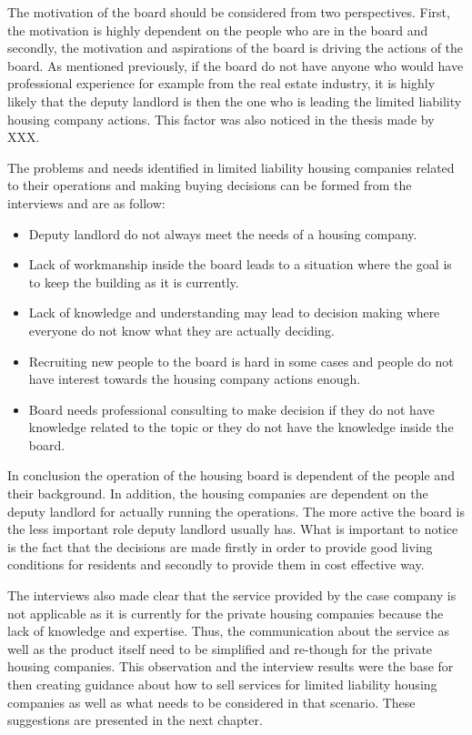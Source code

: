 The motivation of the board should be considered from two perspectives. First, the motivation is highly dependent on the people who are in the board and secondly, the motivation and aspirations of the board is driving the actions of the board. As mentioned previously, if the board do not have anyone who would have professional experience for example from the real estate industry, it is highly likely that the deputy landlord is then the one who is leading the limited liability housing company actions. This factor was also noticed in the thesis made by XXX.

The problems and needs identified in limited liability housing companies related to their operations and making buying decisions can be formed from the interviews and are as follow:
\begin{itemize}
	\setlength{\itemsep}{1pt}
	\item Deputy landlord do not always meet the needs of a housing company.
	\item Lack of workmanship inside the board leads to a situation where the goal is to keep the building as it is currently.
	\item Lack of knowledge and understanding may lead to decision making where everyone do not know what they are actually deciding.
	\item Recruiting new people to the board is hard in some cases and people do not have interest towards the housing company actions enough.
	\item Board needs professional consulting to make decision if they do not have knowledge related to the topic or they do not have the knowledge inside the board.
\end{itemize}

In conclusion the operation of the housing board is dependent of the people and their background. In addition, the housing companies are dependent on the deputy landlord for actually running the operations. The more active the board is the less important role deputy landlord usually has. What is important to notice is the fact that the decisions are made firstly in order to provide good living conditions for residents and secondly to provide them in cost effective way.

The interviews also made clear that the service provided by the case company is not applicable as it is currently for the private housing companies because the lack of knowledge and expertise. Thus, the communication about the service  as well as the product itself need to be simplified and re-though for the private housing companies. This observation and the interview results were the base for then creating guidance about how to sell services for limited liability housing companies as well as what needs to be considered in that scenario. These suggestions are presented in the next chapter.

